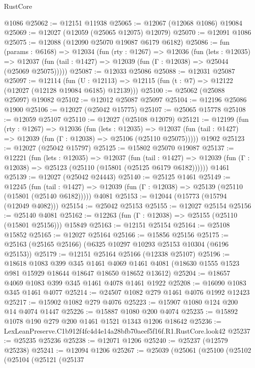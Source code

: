 \begin{lexlean}{RustCore}
\begin{coremodule}
    @1086
@25062 := @12151 @11938
@25065 := @12067 (@12068 @1086) @19084
@25069 := @12027 (@12059 (@25065 @12075) @12079)
@25070 := @12091 @1086
@25075 := @12088 (@12090 @25070 @19087 @6179 @6182)
@25086 := fun (params : @6168) =>
  @12034
    (fun (rty : @1267) =>
    @12036
      (fun (lets : @12035) =>
      @12037 (fun (tail : @1427) => @12039 (fun (Γ : @12038) => @25044 (@25069 @25075)))))
@25087 := @12033 @25086
@25088 := @12031 @25087
@25097 := @12114
    (fun (U : @12113) => @12115 (fun (t : @7) => @12122 (@12027 (@12128 @19084 @6185) @12139)))
@25100 := @25062 (@25088 @25097) @19082
@25102 := @12012 @25087 @25097
@25104 := @12196 @25086 @1900
@25106 := @12027 (@25042 @15775)
@25107 := @25065 @15778
@25108 := @12059 @25107
@25110 := @12027 (@25108 @12079)
@25121 := @12199
    (fun (rty : @1267) =>
    @12036
      (fun (lets : @12035) =>
      @12037 (fun (tail : @1427) => @12039 (fun (Γ : @12038) => @25106 (@25110 @25075)))))
    @1902
@25123 := @12027 (@25042 @15797)
@25125 := @15802 @25070 @19087
@25137 := @12221
    (fun (lets : @12035) =>
    @12037
      (fun (tail : @1427) =>
      @12039 (fun (Γ : @12038) => @25123 (@25110 (@15801 (@25125 @6179 @6182))))))
    @1461
@25139 := @12027 (@25042 @24443)
@25140 := @25125 @1461
@25149 := @12245
    (fun (tail : @1427) => @12039 (fun (Γ : @12038) => @25139 (@25110 (@15801 (@25140 @6182)))))
    @4081
@25153 := @12044 (@15773 (@15794 (@12049 @4082)))
@25154 := @25042 @25153
@25155 := @12027 @25154
@25156 := @25140 @4081
@25162 := @12263 (fun (Γ : @12038) => @25155 (@25110 (@15801 @25156))) @15849
@25163 := @12151 @25154
@25164 := @25108 @15852
@25165 := @12027 @25164
@25166 := @15856 @25156
@25175 := @25163 (@25165 @25166) (@6325 @10297 @10293 @25153 @10304 (@6196 @25153))
@25179 := @12151 @25164 @25166 (@12338 @25107)
@25196 := @18618
    @1083
    @399
    @345
    @1461
    @4069
    @1461
    @4081
    (@18630 @1555 @1523 @981 @15929 @18644 @18647 @18650 @18652 @13612)
@25204 := @18657 @4069 @1083 @399 @345 @1461 @4078 @1461 @1922
@25208 := @16090 @1083 @345 @1461 @4077
@25214 := @24507 @1082 @279 @1461 @4076 @1992 @12423
@25217 := @15902 @1082 @279 @4076
@25223 := @15907 @1080 @124 @200 @14 @4074 @1447
@25226 := @15887 @1080 @200 @4074
@25235 := @15892 @1078 @190 @279 @200 @1461 @1521 @1343 @1206 @18642
@25236 := LexLeanPreserve.C1b912f4fc4d4e14a28bfb70aeef5f16f.R1.RustCore.look42
@25237 := @25235 @25236
@25238 := @12071 @1206
@25240 := @25237 (@12579 @25238)
@25241 := @12094 @1206
@25267 := @25039
    (@25061
      (@25100
        (@25102
          (@25104
            (@25121
              (@25137

\end{coremodule}
\end{lexlean}
